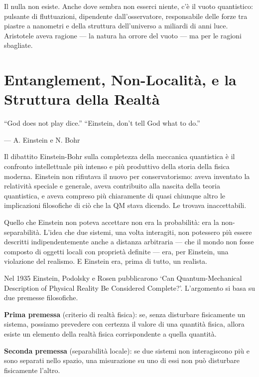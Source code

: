 \documentclass[12pt,a4paper,openany]{book}
\newcommand{\sezione}[1]{\vspace{1.2em}{\large\bfseries #1}\vspace{0.5em}\par}
\begin{document}
Il nulla non esiste. Anche dove sembra non esserci niente, c'è il vuoto quantistico: pulsante di fluttuazioni, dipendente dall'osservatore, responsabile delle forze tra piastre a nanometri e della struttura dell'universo a miliardi di anni luce. Aristotele aveva ragione --- la natura ha orrore del vuoto --- ma per le ragioni sbagliate.

\chapter{Entanglement, Non-Località, e la Struttura della Realtà}

\epigraph{``God does not play dice.'' \quad ``Einstein, don't tell God what to do.''}{--- A. Einstein e N. Bohr}

\sezione{Il dibattito Einstein-Bohr}

Il dibattito Einstein-Bohr sulla completezza della meccanica quantistica è il confronto intellettuale più intenso e più produttivo della storia della fisica moderna. Einstein non rifiutava il nuovo per conservatorismo: aveva inventato la relatività speciale e generale, aveva contribuito alla nascita della teoria quantistica, e aveva compreso più chiaramente di quasi chiunque altro le implicazioni filosofiche di ciò che la QM stava dicendo. Le trovava inaccettabili.

Quello che Einstein non poteva accettare non era la probabilità: era la non-separabilità. L'idea che due sistemi, una volta interagiti, non potessero più essere descritti indipendentemente anche a distanza arbitraria — che il mondo non fosse composto di oggetti locali con proprietà definite — era, per Einstein, una violazione del realismo. E Einstein era, prima di tutto, un realista.

\sezione{L'argomento EPR (1935)}

Nel 1935 Einstein, Podolsky e Rosen pubblicarono `Can Quantum-Mechanical Description of Physical Reality Be Considered Complete?'. L'argomento si basa su due premesse filosofiche.

\textbf{Prima premessa} (criterio di realtà fisica): se, senza disturbare fisicamente un sistema, possiamo prevedere con certezza il valore di una quantità fisica, allora esiste un elemento della realtà fisica corrispondente a quella quantità.

\textbf{Seconda premessa} (separabilità locale): se due sistemi non interagiscono più e sono separati nello spazio, una misurazione su uno di essi non può disturbare fisicamente l'altro.
\end{document}
